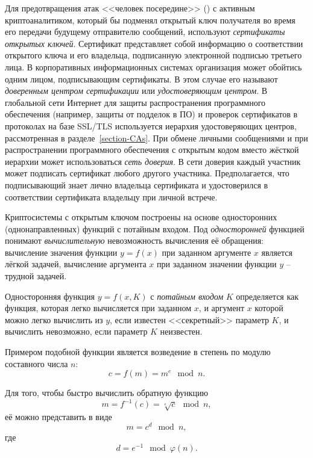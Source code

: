 Для предотвращения атак <<человек посередине>> () с активным криптоаналитиком, который бы подменял открытый ключ получателя во время его передачи будущему отправителю сообщений, используют \emph{сертификаты открытых ключей}. Сертификат представляет собой информацию о соответствии открытого ключа и его владельца, подписанную электронной подписью третьего лица. В корпоративных информационных системах организация может обойтись одним лицом, подписывающим сертификаты. В этом случае его называют \emph{доверенным центром сертификации} или \emph{удостоверяющим центром}. В глобальной сети Интернет для защиты распространения программного обеспечения (например, защиты от подделок в ПО) и проверок сертификатов в протоколах на базе SSL/TLS используется иерархия удостоверяющих центров, рассмотренная в разделе~\ref{section-CAs}. При обмене личными сообщениями и при распространении программного обеспечения с открытым кодом вместо жёсткой иерархии может использоваться \emph{сеть доверия}. В сети доверия каждый участник может подписать сертификат любого другого участника. Предполагается, что подписывающий знает лично владельца сертификата и удостоверился в соответствии сертификата владельцу при личной встрече.

Криптосистемы с открытым ключом построены на основе односторонних (однонаправленных) функций с потайным входом. Под \emph{односторонней} функцией понимают \emph{вычислительную} невозможность вычисления её обращения: вычисление значения функции $y = f(x)$ при заданном аргументе $x$ является лёгкой задачей, вычисление аргумента $x$ при заданном значении функции $y$ -- трудной задачей.

Односторонняя функция $y = f(x,K)$ с \emph{потайным входом} $K$ определяется как функция, которая легко вычисляется при заданном $x$, и аргумент $x$ которой можно легко вычислить из $y$, если известен <<секретный>> параметр $K$, и вычислить невозможно, если параметр $K$ неизвестен.

Примером подобной функции является возведение в степень по модулю составного числа $n$:
	\[ c = f \left( m \right) = m ^ e \mod n.\]

Для того, чтобы быстро вычислить обратную функцию
	\[ m = f^{-1} \left( c \right) = \sqrt[e]{c} \mod n, \]
её можно представить в виде
	\[ m = c^{d} \mod n,\]
где
	\[ d = e^{-1} \mod \varphi \left( n \right). \]

